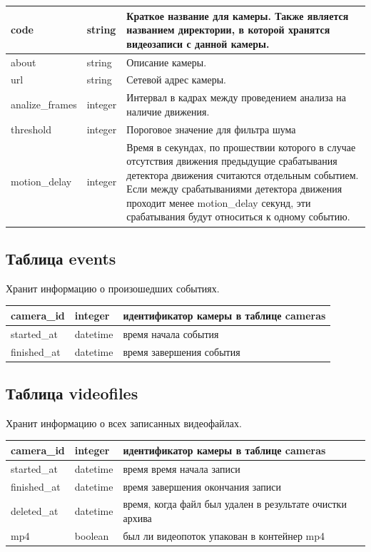 \begin{center}
\begin{tabular}{ | l | l | p{11cm} |}
\hline
code & string & Краткое название для камеры. Также является названием директории, в которой хранятся видеозаписи с данной камеры. \\ \hline
about & string & Описание камеры. \\ \hline
url & string & Сетевой адрес камеры. \\ \hline
analize\_frames & integer & Интервал в кадрах между проведением анализа на наличие движения. \\ \hline
threshold & integer & Пороговое значение для фильтра шума \\ \hline
motion\_delay & integer & Время в секундах, по прошествии которого в случае отсутствия движения предыдущие срабатывания детектора движения считаются отдельным событием. Если между срабатываниями детектора движения проходит менее motion\_delay секунд, эти срабатывания будут относиться к одному событию. \\ \hline
\end{tabular}
\end{center}

\subsection{Таблица events}
Хранит информацию о произошедших событиях.

\begin{center}
\begin{tabular}{ | l | l | p{11cm} |}
\hline
camera\_id & integer & идентификатор камеры в таблице cameras \\ \hline
started\_at & datetime & время начала события \\ \hline
finished\_at & datetime & время завершения события \\ \hline
\end{tabular}
\end{center}

\subsection{Таблица videofiles}
Хранит информацию о всех записанных видеофайлах.

\begin{center}
\begin{tabular}{ | l | l | p{11cm} |}
\hline
camera\_id & integer & идентификатор камеры в таблице cameras \\ \hline
started\_at & datetime & время время начала записи \\ \hline
finished\_at & datetime & время завершения окончания записи \\ \hline
deleted\_at & datetime & время, когда файл был удален в результате очистки архива \\ \hline
mp4 & boolean & был ли видеопоток упакован в контейнер mp4 \\ \hline
\end{tabular}
\end{center}
